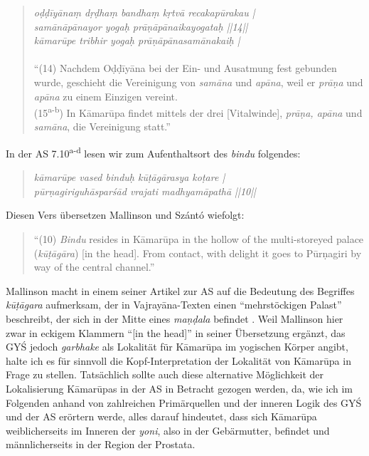 \documentclass[a4paper,12pt]{article}
\begin{document}
\begin{quote} \textit{oḍḍīyānaṃ dṛḍhaṃ bandhaṃ kṛtvā recakapūrakau |\\
    samānāpānayor yogaḥ prāṇāpānaikayogataḥ ||14||\\
    kāmarūpe tribhir yogaḥ prāṇāpānasamānakaiḥ |}\\ \\
  ``(14) Nachdem Oḍḍīyāna bei der Ein- und Ausatmung fest gebunden wurde, geschieht die Vereinigung von \textit{samāna} und \textit{apāna}, weil er \textit{prāṇa} und \textit{apāna} zu einem Einzigen vereint.\\
  (15\textsuperscript{a-b}) In Kāmarūpa findet mittels der drei [Vitalwinde], \textit{prāṇa, apāna} und \textit{samāna}, die Vereinigung statt.'' \end{quote}

 In der AS 7.10\textsuperscript{a-d} lesen wir zum Aufenthaltsort des \textit{bindu} folgendes:

\begin{quote} \textit{kāmarūpe vased binduḥ kūṭāgārasya koṭare |\\ pūrṇagiriguhāsparśād vrajati madhyamāpathā ||10||} \\ \parencite[10]{asiddhi} \end{quote} Diesen Vers übersetzen Mallinson und Szántó wiefolgt: \begin{quote}``(10) \textit{Bindu} resides in Kāmarūpa in the hollow of the multi-storeyed palace (\textit{kūṭāgāra}) [in the head]. From contact, with delight it goes to Pūrṇagiri by way of the central channel.'' \parencite[220]{rootsofyoga2017} \end{quote}

Mallinson macht in einem seiner Artikel zur AS auf die Bedeutung des Begriffes \textit{kūṭāgara} aufmerksam, der in Vajrayāna-Texten einen ``mehrstöckigen Palast'' beschreibt, der sich in der Mitte eines \textit{maṇḍala} befindet \parencite[9]{mallinson2016as}. Weil Mallinson hier zwar in eckigem Klammern ``[in the head]'' in seiner Übersetzung ergänzt, das GYŚ jedoch \textit{garbhake} als Lokalität für Kāmarūpa im yogischen Körper angibt, halte ich es für sinnvoll die Kopf-Interpretation der Lokalität von Kāmarūpa in Frage zu stellen. Tatsächlich sollte auch diese alternative Möglichkeit der Lokalisierung Kāmarūpas in der AS in Betracht gezogen werden, da, wie ich im Folgenden anhand von zahlreichen Primärquellen und der inneren Logik des GYŚ und der AS erörtern werde, alles darauf hindeutet, dass sich Kāmarūpa weiblicherseits im Inneren der \textit{yoni}, also in der Gebärmutter, befindet und männlicherseits in der Region der Prostata. 
\end{document}
